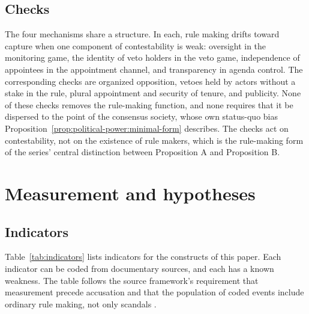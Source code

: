 \documentclass[11pt,letterpaper]{article}
\theoremstyle{definition}
\theoremstyle{remark}
\begin{document}
\subsection{Checks}

The four mechanisms share a structure. In each, rule making drifts toward capture when one component of contestability is weak: oversight in the monitoring game, the identity of veto holders in the veto game, independence of appointees in the appointment channel, and transparency in agenda control. The corresponding checks are organized opposition, vetoes held by actors without a stake in the rule, plural appointment and security of tenure, and publicity. None of these checks removes the rule-making function, and none requires that it be dispersed to the point of the consensus society, whose own status-quo bias Proposition~\ref{prop:political-power:minimal-form} describes. The checks act on contestability, not on the existence of rule makers, which is the rule-making form of the series' central distinction between Proposition A and Proposition B.

\section{Measurement and hypotheses}
\label{sec:measurement}

\subsection{Indicators}

Table~\ref{tab:indicators} lists indicators for the constructs of this paper. Each indicator can be coded from documentary sources, and each has a known weakness. The table follows the source framework's requirement that measurement precede accusation and that the population of coded events include ordinary rule making, not only scandals \citep[Appendix~B]{largo2026hbs}.
\end{document}
